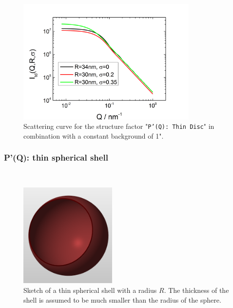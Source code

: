 \begin{figure}[htb]
\begin{center}
\includegraphics[width=0.8\textwidth,height=0.55\textwidth]{../images/form_factor/anisotropic/PprimeThinDisc.png}
\end{center}
\caption{Scattering curve for the structure factor "\texttt{P'(Q): Thin Disc}" in combination with a constant background of 1".}
\label{fig_IQ:PprimeThinDisc}
\end{figure}

\clearpage
\subsubsection{P'(Q): thin spherical shell} ~\\
\label{plugin:Pprime4spShell}

\begin{figure}[htb]
\begin{center}
\includegraphics[width=0.43\textwidth,height=0.463\textwidth]{../images/form_factor/anisotropic/Sphere_thin.png}
\end{center}
\caption{Sketch of a thin spherical shell with a radius $R$. The thickness of the shell is assumed to be much smaller than the radius of the sphere.}
\label{fig:ThinSphericalShell}
\end{figure}

